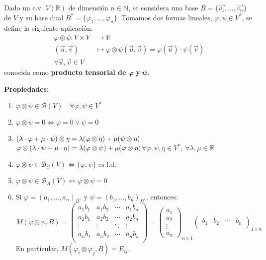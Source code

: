 \documentclass[x11names,table]{report}
\begin{document}
Dado un e.v. $V(\mathbb{R})$ de dimensión $n\in\mathbb{N}$, se considera una base $B=\{\vec{v_1},\dots,\vec{v_n}\}$ de $V$ y su base dual $B^*=\{\varphi_1,\dots,\varphi_n\}$. Tomamos dos formas lineales, $\varphi,\psi\in V^*$, se define la siguiente aplicación:
\begin{align*}
\varphi\otimes\psi: V\times V & \longrightarrow\mathbb{R}\\
(\vec{u},\vec{v})&\longmapsto\varphi\otimes\psi(\vec{u},\vec{v})=\varphi(\vec{u})\cdot\psi(\vec{v})\\
\forall \vec{u},\vec{v}\in V&
\end{align*}
conocida como \textbf{producto tensorial de }$\mathbf{\varphi}$\textbf{ y }$\mathbf{\psi}$.

\textbf{Propiedades:}
\begin{enumerate}
\item $\varphi\otimes\psi\in\mathcal{B}(V)\quad\forall\varphi,\psi\in V^*$
\item $\varphi\otimes\psi=0\Longleftrightarrow\varphi=0 \vee \psi=0$
\item \((\lambda\cdot\varphi+\mu\cdot\psi)\otimes\eta=\lambda(\varphi\otimes\eta)+\mu(\psi\otimes\eta)\\\)\(
		\varphi\otimes(\lambda\cdot\psi+\mu\cdot\eta)=\lambda(\varphi\otimes\psi)+\mu(\varphi\otimes\eta)\\ \)\(\forall \varphi,\psi,\eta\in V^*,\ \forall \lambda,\mu\in \mathbb{R}\)
\item $\varphi\otimes\psi\in\mathcal{B}_S(V)\Longleftrightarrow\{\varphi,\psi\}\text{ es l.d.}$
\item $\varphi\otimes\psi\in\mathcal{B}_A(V)\Longleftrightarrow\varphi\otimes\psi=0$
\item Si $\varphi=(a_1,\dots,a_n)_{B^*}$ y $\psi=(b_1,\dots,b_n)_{B^*}$, entonces:
\[
M(\varphi\otimes\psi,B)=\begin{pmatrix}
a_1b_1 & a_1b_2 & \cdots & a_1b_n\\
a_2b_1 & a_2b_2 & \cdots & a_2b_n\\
\vdots & \vdots & \ddots & \vdots\\
a_nb_1 & a_nb_2 & \cdots & a_nb_n\\
\end{pmatrix}=\begin{pmatrix}
a_1 \\ a_2 \\ \vdots \\ a_n
\end{pmatrix}_{n\times 1}\begin{pmatrix}
b_1 & b_2 & \cdots & b_n\\
\end{pmatrix}_{1\times n}
\]
En particular, $M(\varphi_i\otimes\varphi_j,B)=E_{ij}$.
\end{enumerate}
\end{document}
